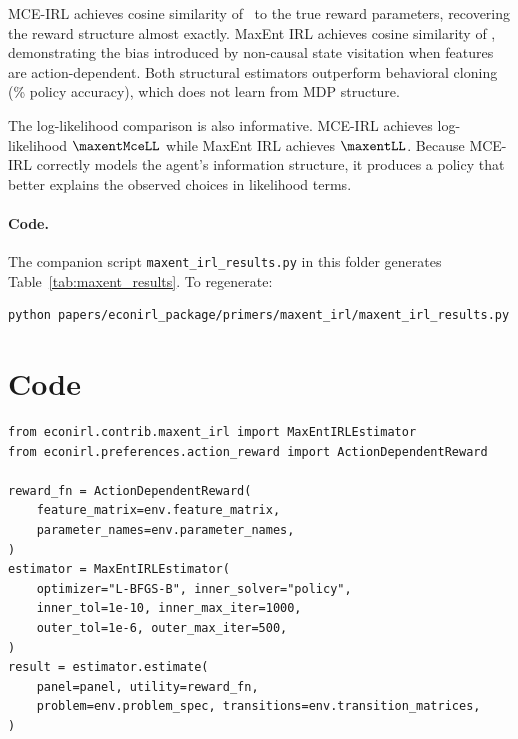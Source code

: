 \documentclass[10pt]{article}
\begin{document}
MCE-IRL achieves cosine similarity of \maxentMceCosine\ to the true reward parameters, recovering the reward structure almost exactly. MaxEnt IRL achieves cosine similarity of \maxentCosine, demonstrating the bias introduced by non-causal state visitation when features are action-dependent. Both structural estimators outperform behavioral cloning (\maxentBcPolicyAcc\% policy accuracy), which does not learn from MDP structure.

The log-likelihood comparison is also informative. MCE-IRL achieves log-likelihood $\maxentMceLL$ while MaxEnt IRL achieves $\maxentLL$. Because MCE-IRL correctly models the agent's information structure, it produces a policy that better explains the observed choices in likelihood terms.

\paragraph{Code.}
The companion script \texttt{maxent\_irl\_results.py} in this folder generates Table~\ref{tab:maxent_results}. To regenerate:
\begin{verbatim}
python papers/econirl_package/primers/maxent_irl/maxent_irl_results.py
\end{verbatim}


\section{Code}

{\small
\begin{verbatim}
from econirl.contrib.maxent_irl import MaxEntIRLEstimator
from econirl.preferences.action_reward import ActionDependentReward

reward_fn = ActionDependentReward(
    feature_matrix=env.feature_matrix,
    parameter_names=env.parameter_names,
)
estimator = MaxEntIRLEstimator(
    optimizer="L-BFGS-B", inner_solver="policy",
    inner_tol=1e-10, inner_max_iter=1000,
    outer_tol=1e-6, outer_max_iter=500,
)
result = estimator.estimate(
    panel=panel, utility=reward_fn,
    problem=env.problem_spec, transitions=env.transition_matrices,
)
\end{verbatim}
}




\end{document}
